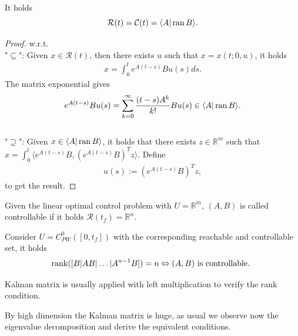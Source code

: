 \begin{theorem}
	It holds
	\begin{equation}
		\mathcal{R}(t) = \mathcal{C}(t) = \langle A |\operatorname{ran} B  \rangle. 
	\end{equation}
\end{theorem}
\begin{proof}
w.r.t. 
\quad\\
"$\subseteq$": Given $x \in \mathcal{R}(t)$, then there exists $u$ such that $x = x(t; 0, u)$, it holds 
\begin{align*}
	x = \int_0^t e^{A(t - s)} Bu(s) ds. 
\end{align*}
The matrix exponential gives
\begin{align*}
	e^{A(t - s)} B u(s) = \sum_{k = 0}^\infty \frac{(t-s) A^k}{k!} B  u(s) \in \langle A| \operatorname{ran} B\rangle. 
\end{align*}
\quad\\
"$\supseteq$": Given $x \in \langle A| \operatorname{ran} B\rangle$, it holds that there exists $z \in \mathbb{R}^m$ such that $x =  \int_0^t \langle e^{A(t - s)}B, (e^{A(t - s)}B)^T z \rangle$. 
Define 
\begin{align*}
	u(s):= (e^{A(t - s)}B)^T z, 
\end{align*} 
to get the result.
\end{proof}

\begin{definition}
	Given the linear optimal control problem with $U = \mathbb{R}^m$, $(A, B)$ is called controllable if it holds $\mathcal{R}(t_f) = \mathbb{R}^n$. 
\end{definition}

\begin{corollary}
Consider $U = C_{PW}^0([0, t_f])$ with the corresponding reachable and controllable set, it holds
\begin{align*}
	\operatorname*{rank}([ B |AB|\dots |A^{n -1}B ] ) = n \Leftrightarrow (A, B) \text{ is controllable. }
\end{align*}
\end{corollary}
\begin{remark}
Kalman matrix is usually applied with left multiplication to verify the rank condition. 	
\end{remark}


By high dimension the Kalman matrix is huge, as usual we observe now the eigenvalue decomposition and derive the equivalent conditions. 

